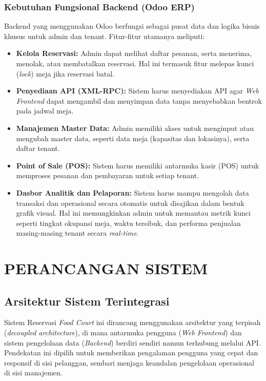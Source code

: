 \documentclass[conference]{IEEEtran}
\begin{document}
\subsubsection{Kebutuhan Fungsional Backend (Odoo ERP)}
Backend yang menggunakan Odoo berfungsi sebagai pusat data dan logika bisnis khusus untuk admin dan tenant. Fitur-fitur utamanya meliputi:
\begin{itemize}
    \item \textbf{Kelola Reservasi:} Admin dapat melihat daftar pesanan, serta menerima, menolak, atau membatalkan reservasi. Hal ini termasuk fitur melepas kunci (\textit{lock}) meja jika reservasi batal.
    \item \textbf{Penyediaan API (XML-RPC):} Sistem harus menyediakan API agar \textit{Web Frontend} dapat mengambil dan menyimpan data tanpa menyebabkan bentrok pada jadwal meja.
    \item \textbf{Manajemen Master Data:} Admin memiliki akses untuk menginput atau mengubah master data, seperti data meja (kapasitas dan lokasinya), serta daftar tenant.
    \item \textbf{Point of Sale (POS):} Sistem harus memiliki antarmuka kasir (POS) untuk memproses pesanan dan pembayaran untuk setiap tenant.
    \item \textbf{Dasbor Analitik dan Pelaporan:} Sistem harus mampu mengolah data transaksi dan operasional secara otomatis untuk disajikan dalam bentuk grafik visual. Hal ini memungkinkan admin untuk memantau metrik kunci seperti tingkat okupansi meja, waktu tersibuk, dan performa penjualan masing-masing tenant secara \textit{real-time}.
\end{itemize}

\section{PERANCANGAN SISTEM}

\subsection{Arsitektur Sistem Terintegrasi}
Sistem Reservasi \textit{Food Court} ini dirancang menggunakan arsitektur yang terpisah (\textit{decoupled architecture}), di mana antarmuka pengguna (\textit{Web Frontend}) dan sistem pengelolaan data (\textit{Backend}) berdiri sendiri namun terhubung melalui API. Pendekatan ini dipilih untuk memberikan pengalaman pengguna yang cepat dan responsif di sisi pelanggan, sembari menjaga keandalan pengelolaan operasional di sisi manajemen.
\end{document}
